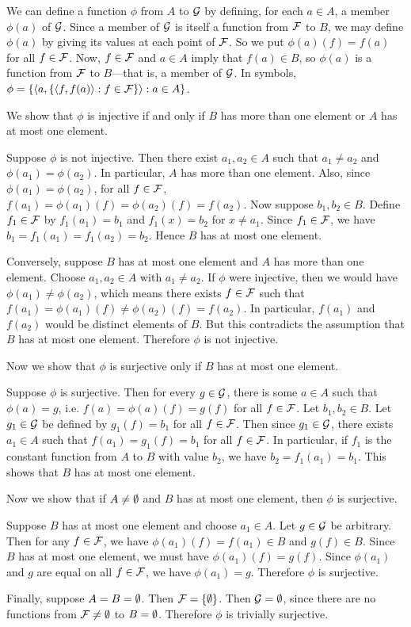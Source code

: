 \documentclass{report}
\begin{document}
\begin{solution}
We can define a function $\phi$ from $A$ to $\mathcal{G}$ by defining, for each $a\in A$,
a member $\phi(a)$ of $\mathcal{G}$. Since a member of $\mathcal{G}$ is itself a function from $\mathcal{F}$
to $B$, we may define $\phi(a)$ by giving its values at each point of $\mathcal{F}$.
So we put $\phi(a)(f) = f(a)$ for all $f\in \mathcal{F}$. Now, $f\in\mathcal{F}$
and $a\in A$ imply that $f(a)\in B$, so $\phi(a)$ is a function from $\mathcal{F}$ to $B$---that is, a member of $\mathcal{G}$.
In symbols, $\phi = \left\{ \left\langle a, \left\{ \left\langle f, f(a)\right\rangle : f\in \mathcal{F} \right\}\right\rangle : a\in A \right\}$.

We show that $\phi$ is injective if and only if $B$ has more than one element or $A$ has at most one element.

Suppose $\phi$ is not injective. Then there exist $a_1,a_2\in A$ such that $a_1\neq a_2$ and
$\phi(a_1)= \phi(a_2)$. In particular, $A$ has more than one element.
Also, since $\phi(a_1)= \phi(a_2)$, for all $f\in\mathcal{F}$, $f(a_1)=\phi(a_1)(f)=\phi(a_2)(f)=f(a_2)$.
Now suppose $b_1,b_2\in B$. Define $f_1\in\mathcal{F}$ by $f_1(a_1)=b_1$ and $f_1(x)=b_2$ for $x\neq a_1$.
Since $f_1\in\mathcal{F}$, we have $b_1=f_1(a_1)=f_1(a_2)=b_2$. Hence $B$ has at most one element.

Conversely, suppose $B$ has at most one element and $A$ has more than one element.
Choose $a_1,a_2\in A$ with $a_1\neq a_2$.
If $\phi$ were injective, then we would have $\phi(a_1)\neq\phi(a_2)$, which means
there exists $f\in\mathcal{F}$ such that $f(a_1)=\phi(a_1)(f)\neq\phi(a_2)(f)=f(a_2)$.
In particular, $f(a_1)$ and $f(a_2)$ would be distinct elements of $B$.
But this contradicts the assumption that $B$ has at most one element. Therefore $\phi$ is not injective.

Now we show that $\phi$ is surjective only if $B$ has at most one element.

Suppose $\phi$ is surjective. Then for every $g\in \mathcal{G}$, there is some $a\in A$
such that $\phi(a) = g$, i.e. $f(a)=\phi(a)(f)=g(f)$ for all $f\in\mathcal{F}$.
Let $b_1,b_2\in B$.
Let $g_1\in\mathcal{G}$ be defined by $g_1(f)=b_1$ for all $f\in\mathcal{F}$.
Then since $g_1\in\mathcal{G}$, there exists $a_1\in A$ such that $f(a_1)=g_1(f)=b_1$ for all $f\in \mathcal{F}$.
In particular, if $f_1$ is the constant function from $A$ to $B$ with value $b_2$,
we have $b_2=f_1(a_1)=b_1$. This shows that $B$ has at most one element.

Now we show that if $A\neq\emptyset$ and $B$ has at most one element, then $\phi$ is surjective.

Suppose $B$ has at most one element and choose $a_1\in A$. Let $g\in\mathcal{G}$ be arbitrary.
Then for any $f\in\mathcal{F}$, we have $\phi(a_1)(f)=f(a_1)\in B$ and $g(f)\in B$.
Since $B$ has at most one element, we must have $\phi(a_1)(f)=g(f)$.
Since $\phi(a_1)$ and $g$ are equal on all $f\in\mathcal{F}$, we have $\phi(a_1)=g$.
Therefore $\phi$ is surjective.

Finally, suppose $A=B=\emptyset$.
Then $\mathcal{F}=\left\{\emptyset\right\}$.
Then $\mathcal{G}=\emptyset$, since there are no functions from $\mathcal{F}\neq\emptyset$ to $B=\emptyset$.
Therefore $\phi$ is trivially surjective.
\end{solution}
\end{document}
